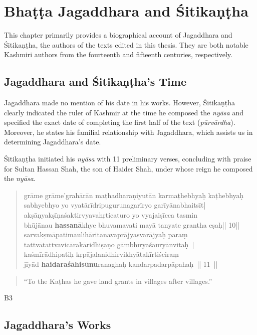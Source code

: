 \chapter{Bhaṭṭa Jagaddhara and Śitikaṇṭha}

This chapter primarily provides a biographical account of Jagaddhara and Śitikaṇṭha, the authors of the texts edited in this thesis. They are both notable Kashmiri authors from the fourteenth and fifteenth centuries, respectively.

\section{Jagaddhara and Śitikaṇṭha's Time}

Jagaddhara made no mention of his date in his works. However, Śitikaṇṭha clearly indicated the ruler of Kashmir at the time he composed the \emph{nyāsa} and specified the exact date of completing the first half of the text (\emph{pūrvārdha}). Moreover, he states his familial relationship with Jagaddhara, which assists us in determining Jagaddhara's date.

Śitikaṇṭha initiated his \emph{nyāsa} with 11 preliminary verses, concluding with praise for Sultan Hassan Shah, the son of Haider Shah, under whose reign he composed the \emph{nyāsa}.

\begin{quote}	
	\textsanskrit{grāme grāme'grahārān maṭhadharaṇiyutān karmaṭhebhyaḥ kaṭhebhyaḥ\\
	sabhyebhyo yo vyatārīdripugurunagarīryo garīyānabhaitsīt|\\
	akṣāṇyakṣīṇaśaktirvyavahṛticaturo yo vyajaiṣīcca tasmin\\
	bhūjānau \textbf{hassanā}khye bhuvamavati mayā tanyate grantha eṣaḥ|| 10||\\
	sarvakṣmāpatimaulihāritanavaprājyasvarājyaḥ paraṃ\\
	tattvātattvavicārakāridhiṣaṇo gāmbhīryaśauryānvitaḥ |\\	
	kaśmīrādhipatiḥ kṛpājalanidhirvikhyātakīrtiściraṃ\\
	jīyād \textbf{haidaraśāhisūnu}ranaghaḥ kandarpadarpāpahaḥ || 11 ||
	}	
\end{quote}

\begin{quote}
	“To the Kaṭhas he gave land grants in villages after villages.”
\end{quote}

\gls{B3}

\section{Jagaddhara's Works}

